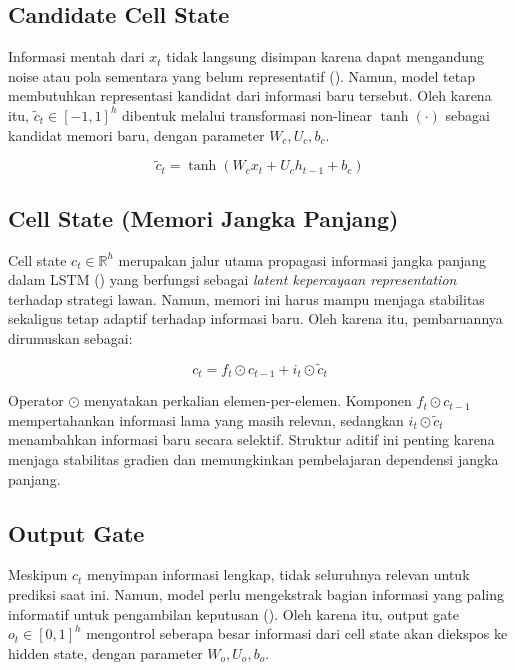 \subsection{Candidate Cell State}

Informasi mentah dari $x_t$ tidak langsung disimpan karena dapat mengandung noise atau pola sementara yang belum representatif (\cite{hochreiter_long_1997}). Namun, model tetap membutuhkan representasi kandidat dari informasi baru tersebut. Oleh karena itu, $\tilde{c}_t \in [-1,1]^h$ dibentuk melalui transformasi non-linear $\tanh(\cdot)$ sebagai kandidat memori baru, dengan parameter $W_c, U_c, b_c$.

\begin{equation}
\tilde{c}_t = \tanh(W_c x_t + U_c h_{t-1} + b_c)
\end{equation}

\subsection{Cell State (Memori Jangka Panjang)}

Cell state $c_t \in \mathbb{R}^h$ merupakan jalur utama propagasi informasi jangka panjang dalam LSTM (\cite{hochreiter_long_1997}) yang berfungsi sebagai \textit{latent kepercayaan representation} terhadap strategi lawan. Namun, memori ini harus mampu menjaga stabilitas sekaligus tetap adaptif terhadap informasi baru. Oleh karena itu, pembaruannya dirumuskan sebagai:

\begin{equation}
c_t = f_t \odot c_{t-1} + i_t \odot \tilde{c}_t
\end{equation}

Operator $\odot$ menyatakan perkalian elemen-per-elemen. Komponen $f_t \odot c_{t-1}$ mempertahankan informasi lama yang masih relevan, sedangkan $i_t \odot \tilde{c}_t$ menambahkan informasi baru secara selektif. Struktur aditif ini penting karena menjaga stabilitas gradien dan memungkinkan pembelajaran dependensi jangka panjang.

\subsection{Output Gate}

Meskipun $c_t$ menyimpan informasi lengkap, tidak seluruhnya relevan untuk prediksi saat ini. Namun, model perlu mengekstrak bagian informasi yang paling informatif untuk pengambilan keputusan (\cite{hochreiter_long_1997}). Oleh karena itu, output gate $o_t \in [0,1]^h$ mengontrol seberapa besar informasi dari cell state akan diekspos ke hidden state, dengan parameter $W_o, U_o, b_o$.

